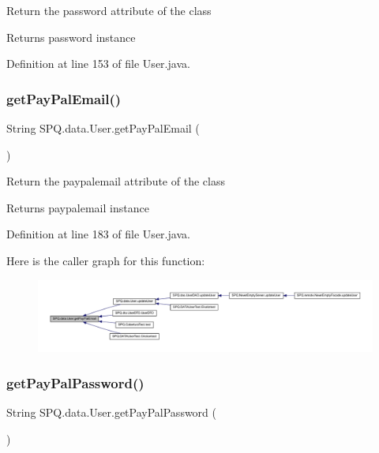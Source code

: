 Return the password attribute of the class \begin{DoxyReturn}{Returns}
password instance 
\end{DoxyReturn}


Definition at line 153 of file User.\+java.

\mbox{\label{class_s_p_q_1_1data_1_1_user_ad3a5ab9fa36272afbc99e7ebfc7de108}} 
\subsubsection{\texorpdfstring{get\+Pay\+Pal\+Email()}{getPayPalEmail()}}
{\footnotesize\ttfamily String S\+P\+Q.\+data.\+User.\+get\+Pay\+Pal\+Email (\begin{DoxyParamCaption}{ }\end{DoxyParamCaption})}

Return the paypalemail attribute of the class \begin{DoxyReturn}{Returns}
paypalemail instance 
\end{DoxyReturn}


Definition at line 183 of file User.\+java.

Here is the caller graph for this function\+:\nopagebreak
\begin{figure}[H]
\begin{center}
\leavevmode
\includegraphics[width=350pt]{class_s_p_q_1_1data_1_1_user_ad3a5ab9fa36272afbc99e7ebfc7de108_icgraph}
\end{center}
\end{figure}
\mbox{\label{class_s_p_q_1_1data_1_1_user_aa3a0bdf1676addb67307fa9a66495fa4}} 
\subsubsection{\texorpdfstring{get\+Pay\+Pal\+Password()}{getPayPalPassword()}}
{\footnotesize\ttfamily String S\+P\+Q.\+data.\+User.\+get\+Pay\+Pal\+Password (\begin{DoxyParamCaption}{ }\end{DoxyParamCaption})}

